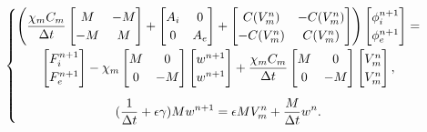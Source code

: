 \documentclass[a4paper,11pt]{article}
\begin{document}
\begin{equation*}
\begin{cases}
\begin{gathered}
\left( \frac{\chi_m C_m}{\Delta t} \begin{bmatrix} M & -M \\ -M & M \end{bmatrix} + \begin{bmatrix} A_i & 0 \\ 0 & A_e \end{bmatrix} + 
\begin{bmatrix}
C(V_m^n) & -C(V_m^n) \\ -C(V_m^n) & C(V_m^n)
\end{bmatrix}\right)
\begin{bmatrix} \phi_i^{n+1} \\ \phi_e^{n+1} \end{bmatrix} = 
\\
\begin{bmatrix} F_i^{n+1} \\ F_e^{n+1} \end{bmatrix} 
- \chi_m \begin{bmatrix}M & 0 \\ 0 & -M \end{bmatrix}
\begin{bmatrix} w^{n+1} \\ w^{n+1} \end{bmatrix}
+ \frac{\chi_m C_m}{\Delta t} \begin{bmatrix}M & 0 \\ 0 & -M\end{bmatrix}
\begin{bmatrix} V_m^{n} \\ V_m^{n} \end{bmatrix}, \vspace{2mm}\\
(\frac{1}{\Delta t}+\epsilon \gamma)M w^{n+1}=\epsilon M V_m^n+\frac{M}{\Delta t} w^n.
\end{gathered}
\end{cases}
\end{equation*}
\end{document}
